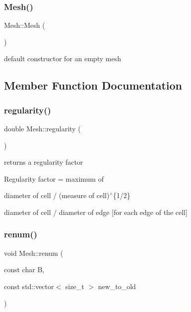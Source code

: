 \subsubsection{\texorpdfstring{Mesh()}{Mesh()}}
{\footnotesize\ttfamily Mesh\+::\+Mesh (\begin{DoxyParamCaption}{ }\end{DoxyParamCaption})}

default constructor for an empty mesh 

\subsection{Member Function Documentation}
\mbox{\label{classHArDCore2D_1_1Mesh_a9bdfdf3e4528832da6925f96edc5ad8f}} 
\subsubsection{\texorpdfstring{regularity()}{regularity()}}
{\footnotesize\ttfamily double Mesh\+::regularity (\begin{DoxyParamCaption}{ }\end{DoxyParamCaption})}



returns a regularity factor 

Regularity factor = maximum of
\begin{DoxyItemize}
\item diameter of cell / (measure of cell)$^\wedge$\{1/2\}
\item diameter of cell / diameter of edge \mbox{[}for each edge of the cell\mbox{]} 
\end{DoxyItemize}\mbox{\label{classHArDCore2D_1_1Mesh_af77873bbc892a7a5b37bf4773c55aefc}} 
\subsubsection{\texorpdfstring{renum()}{renum()}}
{\footnotesize\ttfamily void Mesh\+::renum (\begin{DoxyParamCaption}\item[{const char}]{B,  }\item[{const std\+::vector$<$ size\+\_\+t $>$}]{new\+\_\+to\+\_\+old }\end{DoxyParamCaption})}



